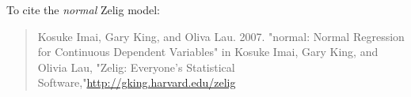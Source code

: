 To cite the \emph{ normal } Zelig model:
 \begin{verse}
 Kosuke Imai, Gary King, and Oliva Lau. 2007. "normal: Normal Regression for Continuous Dependent Variables" in Kosuke Imai, Gary King, and Olivia Lau, "Zelig: Everyone's Statistical Software,"\url{http://gking.harvard.edu/zelig} 
\end{verse}